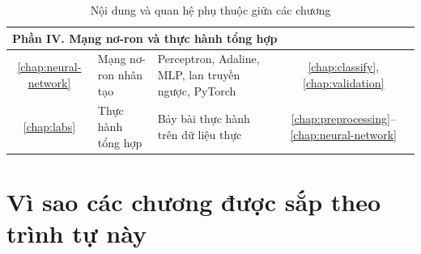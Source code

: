 \begin{table}[tbp]
\begin{tabular}{|c|>{\raggedright\arraybackslash}p{4.3cm}|>{\raggedright\arraybackslash}p{6.2cm}|c|}
\multicolumn{4}{|l|}{\textbf{Phần IV. Mạng nơ-ron và thực hành tổng hợp}} \\ \hline
\ref{chap:neural-network} & Mạng nơ-ron nhân tạo & Perceptron, Adaline, MLP, lan truyền ngược, PyTorch & \ref{chap:classify}, \ref{chap:validation} \\ \hline
\ref{chap:labs} & Thực hành tổng hợp & Bảy bài thực hành trên dữ liệu thực & \ref{chap:preprocessing}--\ref{chap:neural-network} \\ \hline
\end{tabular}
\caption{Nội dung và quan hệ phụ thuộc giữa các chương}
\label{tab:preface-roadmap}
\end{table}

\section*{Vì sao các chương được sắp theo trình tự này}

